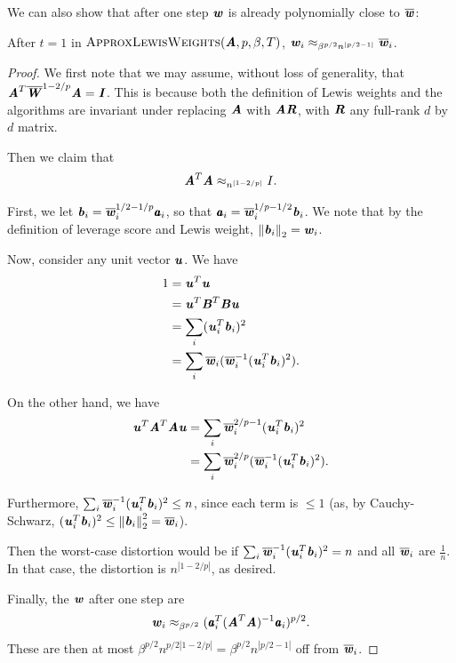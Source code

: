 We can also show that after one step $\ww$ is already polynomially close to $\wwbar$:
\begin{lemma}
\label{lem:initialization}
After $t = 1$ in $\textsc{ApproxLewisWeights}(\AA, p, \beta, T)$, $\ww_i \approx_{\beta^{p/2} n^{|p/2 - 1|}} \wwbar_i$.
\end{lemma}
\begin{proof}
We first note that we may assume, without loss of generality, that $\AA^T \WWbar^{1 - 2/p} \AA = \II$.
This is because both the definition of Lewis weights and the algorithms are invariant under replacing
$\AA$ with $\AA \RR$, with $\RR$ any full-rank $d$ by $d$ matrix.

Then we claim that
\begin{equation*}
\AA^T \AA \approx_{n^{|1 - 2/p|}} I.
\end{equation*}

First, we let $\bb_i = \wwbar_i^{1/2 - 1/p} \aa_i$, so that $\aa_i = \wwbar_i^{1/p - 1/2} \bb_i$.
We note that by the definition of leverage score and Lewis weight, $\norm{\bb_i}_2 = \ww_i$.

Now, consider any unit vector $\uu$.  We have
\begin{align*}
1 &= \uu^T \uu \\
&= \uu^T \BB^T \BB \uu \\
&= \sum_i (\uu_i^T \bb_i)^2 \\
&= \sum_i \wwbar_i (\wwbar_i^{-1} (\uu_i^T \bb_i)^2).
\end{align*}

On the other hand, we have
\begin{align*}
\uu^T \AA^T \AA \uu &= \sum_i \wwbar_i^{2/p - 1} (\uu_i^T \bb_i)^2 \\
&= \sum_i \wwbar_i^{2/p} (\wwbar_i^{-1} (\uu_i^T \bb_i)^2).
\end{align*}

Furthermore, $\sum_i \wwbar_i^{-1} (\uu_i^T \bb_i)^2 \leq n$, since each term is
$\leq 1$ (as, by Cauchy-Schwarz, $(\uu_i^T \bb_i)^2 \leq \norm{\bb_i}_2^2 = \wwbar_i$).

Then the worst-case distortion would be if $\sum_i \wwbar_i^{-1} (\uu_i^T \bb_i)^2 = n$ and all $\wwbar_i$ are $\frac{1}{n}$.  In
that case, the distortion is $n^{|1 - 2/p|}$, as desired.

Finally, the $\ww$ after one step are
\begin{equation*}
\ww_i \approx_{\beta^{p/2}} (\aa_i^T (\AA^T \AA)^{-1} \aa_i)^{p/2}.
\end{equation*}
These are then at most $\beta^{p/2} n^{p/2 |1-2/p|} = \beta^{p/2} n^{|p/2 - 1|}$ off from $\wwbar_i$.
\end{proof}

